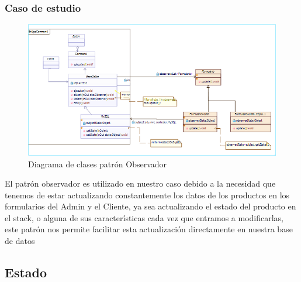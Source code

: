 \subsubsection{Caso de estudio}
	\begin{figure}[h!]
	\centering
	\includegraphics[width=1.0\linewidth]{arquitectura/imagenes/DiagramaObservador}
	\caption{Diagrama de clases patrón Observador}
\end{figure}



El patrón observador es utilizado en nuestro caso debido a la necesidad que tenemos de estar actualizando constantemente los datos de los productos en los formularios del Admin y el Cliente, ya sea actualizando el estado del producto en el stack, o alguna de sus características cada vez que entramos a modificarlas, este patrón nos permite facilitar esta actualización directamente en nuestra base de datos
\newpage

\newpage

\subsection{Estado}

